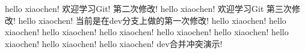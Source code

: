 hello xiaochen! 欢迎学习Git! 第二次修改!
hello xiaochen! 欢迎学习Git  第三次修改!
hello xiaochen!  当前是在dev分支上做的第一次修改!
hello xiaochen!
hello xiaochen!
hello xiaochen!
hello xiaochen!
hello xiaochen!
hello xiaochen!
hello xiaochen!
hello xiaochen!
hello xiaochen! dev合并冲突演示!
